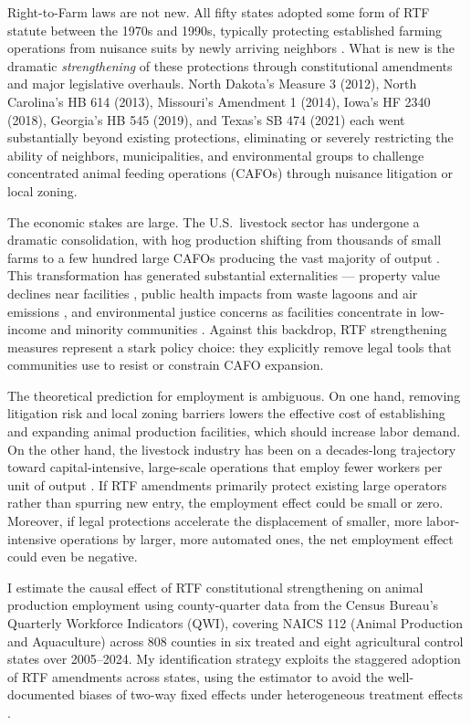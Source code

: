 \documentclass[12pt]{article}
\begin{document}
Right-to-Farm laws are not new. All fifty states adopted some form of RTF statute between the 1970s and 1990s, typically protecting established farming operations from nuisance suits by newly arriving neighbors \citep{hamilton1998, adelaja1999}. What is new is the dramatic \textit{strengthening} of these protections through constitutional amendments and major legislative overhauls. North Dakota's Measure 3 (2012), North Carolina's HB 614 (2013), Missouri's Amendment 1 (2014), Iowa's HF 2340 (2018), Georgia's HB 545 (2019), and Texas's SB 474 (2021) each went substantially beyond existing protections, eliminating or severely restricting the ability of neighbors, municipalities, and environmental groups to challenge concentrated animal feeding operations (CAFOs) through nuisance litigation or local zoning.

The economic stakes are large. The U.S.\ livestock sector has undergone a dramatic consolidation, with hog production shifting from thousands of small farms to a few hundred large CAFOs producing the vast majority of output \citep{macdonald2009, key2007}. This transformation has generated substantial externalities --- property value declines near facilities \citep{palmquist1997, herriges2005, lawley2021}, public health impacts from waste lagoons and air emissions \citep{wing2000, osterberg2004, sneeringer2009health}, and environmental justice concerns as facilities concentrate in low-income and minority communities \citep{wing2000}. Against this backdrop, RTF strengthening measures represent a stark policy choice: they explicitly remove legal tools that communities use to resist or constrain CAFO expansion.

The theoretical prediction for employment is ambiguous. On one hand, removing litigation risk and local zoning barriers lowers the effective cost of establishing and expanding animal production facilities, which should increase labor demand. On the other hand, the livestock industry has been on a decades-long trajectory toward capital-intensive, large-scale operations that employ fewer workers per unit of output \citep{macdonald2000, roe2002}. If RTF amendments primarily protect existing large operators rather than spurring new entry, the employment effect could be small or zero. Moreover, if legal protections accelerate the displacement of smaller, more labor-intensive operations by larger, more automated ones, the net employment effect could even be negative.

I estimate the causal effect of RTF constitutional strengthening on animal production employment using county-quarter data from the Census Bureau's Quarterly Workforce Indicators (QWI), covering NAICS 112 (Animal Production and Aquaculture) across 808 counties in six treated and eight agricultural control states over 2005--2024. My identification strategy exploits the staggered adoption of RTF amendments across states, using the \citet{callaway2021} estimator to avoid the well-documented biases of two-way fixed effects under heterogeneous treatment effects \citep{goodmanbacon2021, dechaisemartin2020}.
\end{document}
